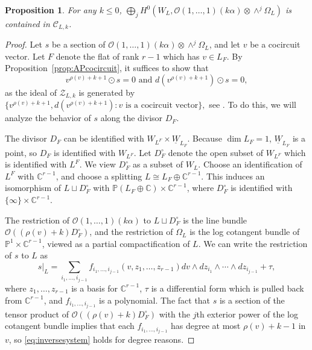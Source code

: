 \documentclass{amsart}
\newtheorem{proposition}[theorem]{Proposition}
\theoremstyle{definition}
\begin{document}
\begin{proposition}\label{prop:containment}
For any $k \le 0$, $\bigoplus_j H^0(W_L, \mathcal{O}(1, \dotsc, 1)(k\alpha) \otimes \wedge^j \Omega_L)$ is contained in $\mathcal{C}_{L, k}$. 
\end{proposition}

\begin{proof}
Let $s$ be a section of $\mathcal{O}(1, \dotsc, 1)(k\alpha) \otimes \wedge^j \Omega_L$, and let $v$ be a cocircuit vector. Let $F$ denote the flat of rank $r-1$ which has $v \in L_F$. By Proposition~\ref{prop:APcocircuit}, it suffices to show that
\begin{equation}\label{eq:inversesystem}
v^{\rho(v) + k + 1} \odot s = 0 \text{ and }d(v^{\rho(v) + k + 1}) \odot s = 0,
\end{equation}
as the ideal of $\mathcal{Z}_{L, k}$ is generated by $\{v^{\rho(v) + k + 1}, d(v^{\rho(v) + k + 1}) : v \text{ is a cocircuit vector}\},$ see \cite[(1.2)]{Superspace}. To do this, we will analyze the behavior of $s$ along the divisor $D_F$. 

The divisor $D_F$ can be identified with $W_{L^F} \times \underline{W}_{L_F}$. Because $\dim L_F = 1$, $\underline{W}_{L_F}$ is a point, so $D_F$ is identified with $W_{L^F}$. Let $D_F^{\circ}$ denote the open subset of $W_{L^F}$ which is identified with $L^F$. We view $D_F^{\circ}$ as a subset of $W_L$. Choose an identification of $L^F$ with $\mathbb{C}^{r-1}$, and choose a splitting $L \cong L_F \oplus \mathbb{C}^{r-1}$. This induces an isomorphism of $L \sqcup D_F^{\circ}$ with $\mathbb{P}(L_F \oplus \mathbb{C}) \times \mathbb{C}^{r-1}$, where $D_F^{\circ}$ is identified with $\{\infty\} \times \mathbb{C}^{r-1}$. 

The restriction of $\mathcal{O}(1, \dotsc, 1)(k\alpha)$ to $L \sqcup D_F^{\circ}$ is the line bundle $\mathcal{O}((\rho(v) + k)D_F^{\circ})$, and the restriction of $\Omega_L$ is the log cotangent bundle of $\mathbb{P}^1 \times \mathbb{C}^{r-1}$, viewed as a partial compactification of $L$. We can write the restriction of $s$ to $L$ as 
$$s|_{L} = \sum_{i_1, \dotsc, i_{j-1}} f_{i_1, \dotsc, i_{j-1}}(v, z_1, \dotsc, z_{r-1}) dv \wedge dz_{i_1} \wedge \dotsb \wedge dz_{i_{j-1}} + \tau,$$ where $z_1, \dotsc, z_{r-1}$ is a basis for $\mathbb{C}^{r-1}$, $\tau$ is a differential form which is pulled back from $\mathbb{C}^{r-1}$, and $f_{i_1, \dotsc, i_{j-1}}$ is a polynomial. The fact that $s$ is a section of the tensor product of $\mathcal{O}((\rho(v) + k)D_F^{\circ})$ with the $j$th exterior power of the log cotangent bundle implies that each $f_{i_1, \dotsc, i_{j-1}}$ has degree at most $\rho(v) + k - 1$ in $v$, so \eqref{eq:inversesystem} holds for degree reasons. 
\end{proof}
\end{document}
